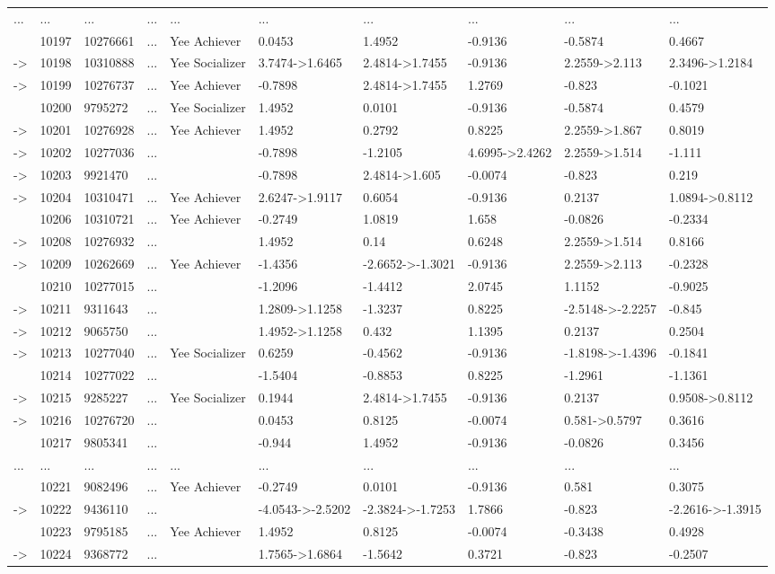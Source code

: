 \documentclass[6pt]{article}
\begin{document}
\begin{landscape}
{\begin{longtable}{llllllllll}
...&...&...&...&...&...&...&...&...&...\tabularnewline
&10197&10276661&...&Yee Achiever&0.0453&1.4952&-0.9136&-0.5874&0.4667\tabularnewline
-\textgreater &10198&10310888&...&Yee Socializer&3.7474-\textgreater 1.6465&2.4814-\textgreater 1.7455&-0.9136&2.2559-\textgreater 2.113&2.3496-\textgreater 1.2184\tabularnewline
-\textgreater &10199&10276737&...&Yee Achiever&-0.7898&2.4814-\textgreater 1.7455&1.2769&-0.823&-0.1021\tabularnewline
&10200&9795272&...&Yee Socializer&1.4952&0.0101&-0.9136&-0.5874&0.4579\tabularnewline
-\textgreater &10201&10276928&...&Yee Achiever&1.4952&0.2792&0.8225&2.2559-\textgreater 1.867&0.8019\tabularnewline
-\textgreater &10202&10277036&...&&-0.7898&-1.2105&4.6995-\textgreater 2.4262&2.2559-\textgreater 1.514&-1.111\tabularnewline
-\textgreater &10203&9921470&...&&-0.7898&2.4814-\textgreater 1.605&-0.0074&-0.823&0.219\tabularnewline
-\textgreater &10204&10310471&...&Yee Achiever&2.6247-\textgreater 1.9117&0.6054&-0.9136&0.2137&1.0894-\textgreater 0.8112\tabularnewline
&10206&10310721&...&Yee Achiever&-0.2749&1.0819&1.658&-0.0826&-0.2334\tabularnewline
-\textgreater &10208&10276932&...&&1.4952&0.14&0.6248&2.2559-\textgreater 1.514&0.8166\tabularnewline
-\textgreater &10209&10262669&...&Yee Achiever&-1.4356&-2.6652-\textgreater -1.3021&-0.9136&2.2559-\textgreater 2.113&-0.2328\tabularnewline
&10210&10277015&...&&-1.2096&-1.4412&2.0745&1.1152&-0.9025\tabularnewline
-\textgreater &10211&9311643&...&&1.2809-\textgreater 1.1258&-1.3237&0.8225&-2.5148-\textgreater -2.2257&-0.845\tabularnewline
-\textgreater &10212&9065750&...&&1.4952-\textgreater 1.1258&0.432&1.1395&0.2137&0.2504\tabularnewline
-\textgreater &10213&10277040&...&Yee Socializer&0.6259&-0.4562&-0.9136&-1.8198-\textgreater -1.4396&-0.1841\tabularnewline
&10214&10277022&...&&-1.5404&-0.8853&0.8225&-1.2961&-1.1361\tabularnewline
-\textgreater &10215&9285227&...&Yee Socializer&0.1944&2.4814-\textgreater 1.7455&-0.9136&0.2137&0.9508-\textgreater 0.8112\tabularnewline
-\textgreater &10216&10276720&...&&0.0453&0.8125&-0.0074&0.581-\textgreater 0.5797&0.3616\tabularnewline
&10217&9805341&...&&-0.944&1.4952&-0.9136&-0.0826&0.3456\tabularnewline
...&...&...&...&...&...&...&...&...&...\tabularnewline
&10221&9082496&...&Yee Achiever&-0.2749&0.0101&-0.9136&0.581&0.3075\tabularnewline
-\textgreater &10222&9436110&...&&-4.0543-\textgreater -2.5202&-2.3824-\textgreater -1.7253&1.7866&-0.823&-2.2616-\textgreater -1.3915\tabularnewline
&10223&9795185&...&Yee Achiever&1.4952&0.8125&-0.0074&-0.3438&0.4928\tabularnewline
-\textgreater &10224&9368772&...&&1.7565-\textgreater 1.6864&-1.5642&0.3721&-0.823&-0.2507\tabularnewline

\end{longtable}}
\end{landscape}
\end{document}
